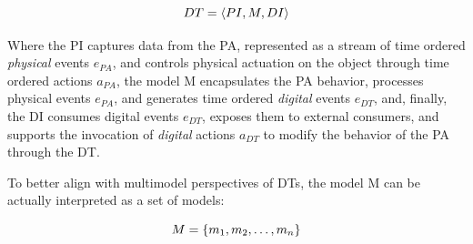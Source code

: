 \begin{equation} 
\label{eq:dt_basic_model}
        DT = \langle PI, M, DI \rangle\\
\end{equation}

Where the \ac{PI} captures data from the \acf{PA}, represented as a stream of time ordered \emph{physical} events $e_{PA}$, and controls physical actuation on the object through time ordered actions $a_{PA}$, 
%
the model \ac{M} encapsulates the \ac{PA} behavior, processes physical events $e_{PA}$, and generates time ordered \emph{digital} events $e_{DT}$,
%
and, finally, the \ac{DI} consumes digital events $e_{DT}$, exposes them to external consumers, and supports the invocation of \emph{digital} actions $a_{DT}$ to modify the behavior of the \ac{PA} through the \ac{DT}.

To better align with multimodel perspectives of \acp{DT}, the model \ac{M} can be actually interpreted as a set of models:

\begin{equation}\label{eq:multi_model}
        M = \{ m_{1}, m_{2}, \dots, m_{n} \} \\
\end{equation}


